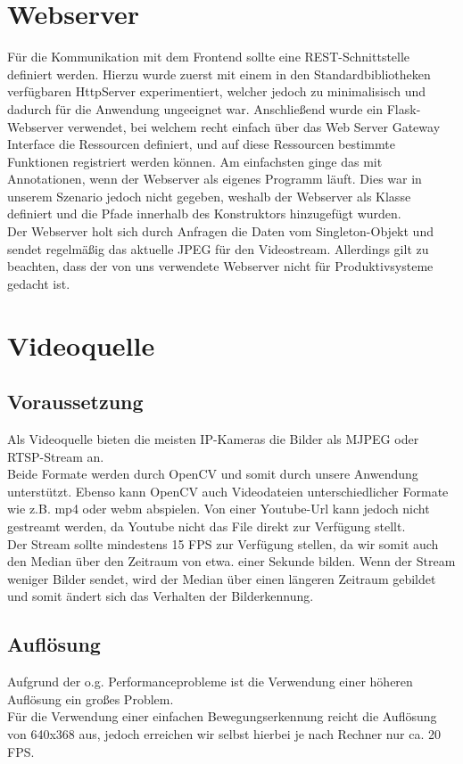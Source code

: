\section{Webserver}
Für die Kommunikation mit dem Frontend sollte eine REST-Schnittstelle definiert werden. Hierzu wurde zuerst mit einem in den Standardbibliotheken verfügbaren HttpServer experimentiert,
welcher jedoch zu minimalisisch und dadurch für die Anwendung ungeeignet war. Anschließend wurde ein Flask-Webserver verwendet, bei welchem recht einfach über das Web Server Gateway Interface die Ressourcen definiert,
und auf diese Ressourcen bestimmte Funktionen registriert werden können. Am einfachsten ginge das mit Annotationen, wenn der Webserver als eigenes Programm läuft. Dies war in unserem Szenario jedoch nicht gegeben, weshalb der Webserver als Klasse definiert und die Pfade innerhalb des Konstruktors hinzugefügt wurden.\\
Der Webserver holt sich durch Anfragen die Daten vom Singleton-Objekt und sendet regelmäßig das aktuelle JPEG für den Videostream.
Allerdings gilt zu beachten, dass der von uns verwendete Webserver nicht für Produktivsysteme gedacht ist.

\section{Videoquelle}
\subsection{Voraussetzung}
Als Videoquelle bieten die meisten IP-Kameras die Bilder als MJPEG oder RTSP-Stream an.\\
Beide Formate werden durch OpenCV und somit durch unsere Anwendung unterstützt.
Ebenso kann OpenCV auch Videodateien unterschiedlicher Formate wie z.B. mp4 oder webm abspielen.
Von einer Youtube-Url kann jedoch nicht gestreamt werden, da Youtube nicht das File direkt zur Verfügung stellt.\\
Der Stream sollte mindestens 15 FPS zur Verfügung stellen, da wir somit auch den Median über den Zeitraum von etwa. einer Sekunde bilden. Wenn der Stream weniger Bilder sendet, wird der Median über einen längeren Zeitraum gebildet und somit ändert sich das Verhalten der Bilderkennung.

\subsection{Auflösung}
Aufgrund der o.g. Performanceprobleme ist die Verwendung einer höheren Auflösung ein großes Problem.\\ Für die Verwendung einer einfachen Bewegungserkennung reicht die Auflösung von 640x368 aus, jedoch erreichen wir selbst hierbei je nach Rechner nur ca. 20 FPS.